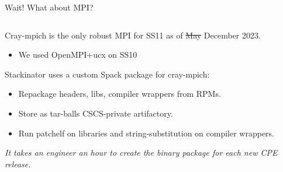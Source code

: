 \documentclass[aspectratio=43]{beamer}
\begin{document}
\begin{frame}[fragile]{Wait! What about MPI?}
    \begin{columns}[T]
        \begin{column}{0.65\textwidth}
            Cray-mpich is the only robust MPI for SS11 as of \sout{May} December 2023.
            \begin{itemize}
                \item We used OpenMPI+ucx on SS10
            \end{itemize}

            \vspace{10pt}

            Stackinator uses a custom Spack package for cray-mpich:
            \begin{itemize}
                \item Repackage headers, libs, compiler wrappers from RPMs.
                \item Store as tar-balls CSCS-private artifactory.
                \item Run patchelf on libraries and string-substitution on compiler wrappers.
            \end{itemize}
            \emph{It takes an engineer an hour to create the binary package for each new CPE release.}
        \end{column}
        \hspace{-40pt}
        \begin{column}{0.4\textwidth}
            {
            \setlength{\DTbaselineskip}{5pt}
            \footnotesize
            
            }
        \end{column}
    \end{columns}

\end{frame}
\end{document}
